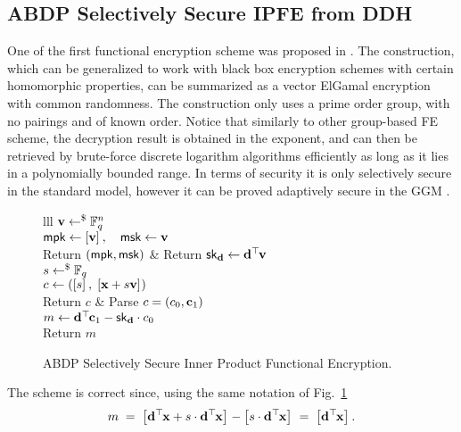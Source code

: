 
\subsection{ABDP Selectively Secure IPFE from DDH}
One of the first functional encryption scheme was proposed in \cite{PKC:ABDP15}.
The construction, which can be generalized to work with black box encryption schemes with certain homomorphic properties, can be summarized as a vector ElGamal encryption with common randomness.
The construction only uses a prime order group, with no pairings and of known order.
Notice that similarly to other group-based FE scheme, the decryption result is obtained in the exponent, and can then be retrieved by brute-force discrete logarithm algorithms efficiently as long as it lies in a polynomially bounded range.
In terms of security it is only selectively secure in the standard model, however it can be proved adaptively secure in the GGM .

\begin{figure}[htb]
\centering
\begin{pcarray}{lll}
		{
			$\mathbf{v} \gets^{\$} \mathbb{F}_q^n$
				\\
			$\mathsf{mpk} \gets \left[{\mathbf{v}}\right]_{}, \quad \mathsf{msk} \gets \mathbf{v}$
				\\
			Return $(\mathsf{mpk}, \mathsf{msk})$
 		}
	&
		{
			Return $\mathsf{sk}_{\mathbf{d}} \gets \mathbf{d}^\top\hspace{-.1em} \mathbf{v}$
		}
	\\
		{
			$s \gets^{\$} \mathbb{F}_q$
				\\
			$c \gets \left( \left[{s}\right]_{}, 
				\; 
			\left[{\mathbf{x} + s \mathbf{v}}\right]_{} \right)$
				\\
			Return $c$
		}
	&
		{
			Parse $c = (c_0, \mathbf{c}_1)$
				\\
			$m \gets \mathbf{d}^\top\hspace{-.1em} \mathbf{c}_1 - \mathsf{sk}_{\mathbf{d}} \cdot c_0$
				\\
			Return $m$
		}
\end{pcarray}
\caption{ABDP Selectively Secure Inner Product Functional Encryption.}
\label{prot:ABDP15:IPFE}
\end{figure}

The scheme is correct since, using the same notation of Fig.~\ref{prot:ABDP15:IPFE}
\[
	m
		\; = \;
	\left[{\mathbf{d}^\top\hspace{-.1em} \mathbf{x} + s \cdot \mathbf{d}^\top\hspace{-.1em} \mathbf{x}}\right]_{}
		-
	\left[{s \cdot \mathbf{d}^\top\hspace{-.1em} \mathbf{x}}\right]_{}
		\; = \;
	\left[{\mathbf{d}^\top\hspace{-.1em} \mathbf{x}}\right]_{}.
\]

